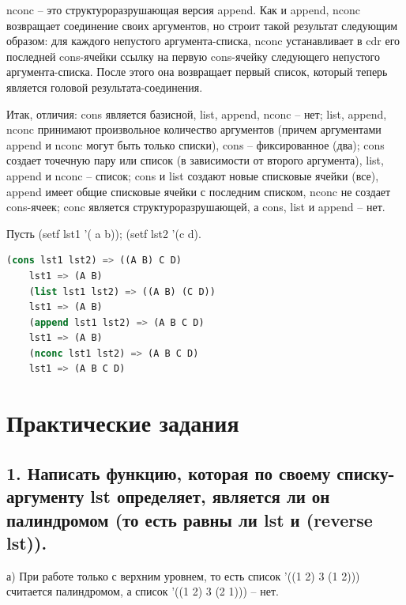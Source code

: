 \documentclass[12pt]{report}
\begin{document}
nconc -- это структуроразрушающая версия append. Как и append, nconc возвращает соединение своих аргументов, но строит такой результат следующим образом: для каждого непустого аргумента-списка, nconc устанавливает в cdr его последней cons-ячейки ссылку на первую cons-ячейку следующего непустого аргумента-списка. После этого она возвращает первый список, который теперь является головой результата-соединения.

Итак, отличия: cons является базисной, list, append, nconc -- нет; list, append, nconc принимают произвольное количество аргументов (причем аргументами append и nconc могут быть только списки), cons -- фиксированное (два); cons создает точечную пару или список (в зависимости от второго аргумента), list, append и nconc -- список; cons и list создают новые списковые ячейки (все), append имеет общие списковые ячейки с последним списком, nconc не создает cons-ячеек; conc является структуроразрушающей, а cons, list и append -- нет.

Пусть (setf lst1 '( a b)); (setf lst2 '(c d).



\begin{lstlisting}[language=Lisp]	
	(cons lst1 lst2) => ((A B) C D)
	lst1 => (A B)
	(list lst1 lst2) => ((A B) (C D))
	lst1 => (A B)
	(append lst1 lst2) => (A B C D)
	lst1 => (A B)
	(nconc lst1 lst2) => (A B C D)
	lst1 => (A B C D)
\end{lstlisting}



	
\chapter*{Практические задания}	

\section*{1. Написать функцию, которая по своему списку-аргументу lst определяет, является ли он палиндромом (то есть равны ли lst и (reverse lst)).}

а) При работе только с верхним уровнем, то есть список '((1 2) 3 (1 2))) считается палиндромом, а список '((1 2) 3 (2 1))) -- нет.
\end{document}
